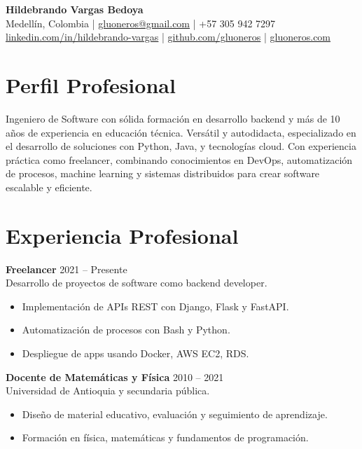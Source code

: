 \documentclass[a4paper,10pt]{article}
\begin{document}
	
	\begin{center}
		{\Huge \textbf{Hildebrando Vargas Bedoya}} \\
		\vspace{4pt}
		Medellín, Colombia \quad | \quad
		\href{mailto:gluoneros@gmail.com}{gluoneros@gmail.com} \quad | \quad
		+57 305 942 7297 \\
		\href{https://linkedin.com/in/hildebrando-vargas}{linkedin.com/in/hildebrando-vargas} \quad | \quad
		\href{https://github.com/gluoneros}{github.com/gluoneros} \quad | \quad
		\href{https://gluoneros.com}{gluoneros.com}
	\end{center}
	
	\vspace{0.5em}
	
	\section*{Perfil Profesional}
	Ingeniero de Software con sólida formación en desarrollo backend y más de 10 años de experiencia en educación técnica. Versátil y autodidacta, especializado en el desarrollo de soluciones con Python, Java, y tecnologías cloud. Con experiencia práctica como freelancer, combinando conocimientos en DevOps, automatización de procesos, machine learning y sistemas distribuidos para crear software escalable y eficiente.
	
	\section*{Experiencia Profesional}
	\textbf{Freelancer} \hfill 2021 -- Presente \\
	Desarrollo de proyectos de software como backend developer. 
	\begin{itemize}
		\item Implementación de APIs REST con Django, Flask y FastAPI.
		\item Automatización de procesos con Bash y Python.
		\item Despliegue de apps usando Docker, AWS EC2, RDS.
	\end{itemize}
	
	\textbf{Docente de Matemáticas y Física} \hfill 2010 -- 2021 \\
	Universidad de Antioquia y secundaria pública. 
	\begin{itemize}
		\item Diseño de material educativo, evaluación y seguimiento de aprendizaje.
		\item Formación en física, matemáticas y fundamentos de programación.
	\end{itemize}
	
\end{document}
